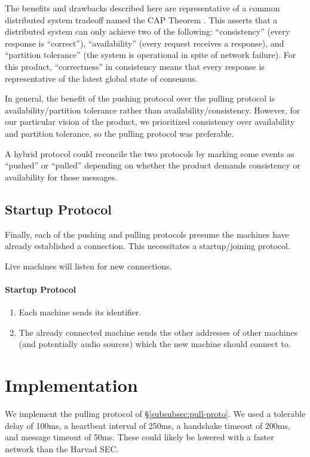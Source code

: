 \documentclass[%
               nonacm,sigconf,10pt]{acmart}
\begin{document}
The benefits and drawbacks described here are representative of a common distributed system tradeoff named the CAP Theorem \citep{Bre00, GL02}. This asserts that a distributed system can only achieve two of the following: ``consistency'' (every response is ``correct''), ``availability'' (every request receives a response), and ``partition tolerance'' (the system is operational in spite of network failure). For this product, ``correctness'' in consistency means that every response is representative of the latest global state of consensus.

In general, the benefit of the pushing protocol over the pulling protocol is availability/partition tolerance rather than availability/consistency. However, for our particular vision of the product, we prioritized consistency over availability and partition tolerance, so the pulling protocol was preferable.

A hybrid protocol could reconcile the two protocols by marking some events as ``pushed'' or ``pulled'' depending on whether the product demands consistency or availability for those messages.

\subsection{Startup Protocol}\label{subsec:start-proto}

Finally, each of the pushing and pulling protocols presume the machines have already established a connection. This necessitates a startup/joining protocol.

Live machines will listen for new connections.

\paragraph{Startup Protocol}
\begin{enumerate}
    \item Each machine sends its identifier.
    \item The already connected machine sends the other addresses of other machines (and potentially audio sources) which the new machine should connect to.
\end{enumerate}

\section{Implementation}\label{sec:impl}

We implement the pulling protocol of \S \ref{subsubsec:pull-proto}. We used a tolerable delay of 100ms, a heartbeat interval of 250ms, a handshake timeout of 200ms, and message timeout of 50ms. These could likely be lowered with a faster network than the Harvad SEC.
\end{document}
